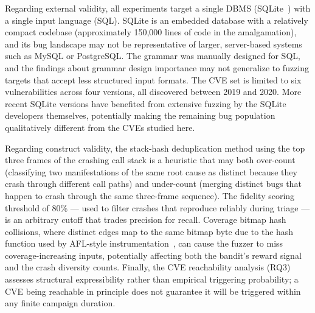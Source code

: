 Regarding external validity, all experiments target a single DBMS (SQLite~\cite{sqlite}) with a single input language (SQL). SQLite is an embedded database with a relatively compact codebase (approximately 150,000 lines of code in the amalgamation), and its bug landscape may not be representative of larger, server-based systems such as MySQL or PostgreSQL. The grammar was manually designed for SQL, and the findings about grammar design importance may not generalize to fuzzing targets that accept less structured input formats. The CVE set is limited to six vulnerabilities across four versions, all discovered between 2019 and 2020. More recent SQLite versions have benefited from extensive fuzzing by the SQLite developers themselves, potentially making the remaining bug population qualitatively different from the CVEs studied here.

Regarding construct validity, the stack-hash deduplication method using the top three frames of the crashing call stack is a heuristic that may both over-count (classifying two manifestations of the same root cause as distinct because they crash through different call paths) and under-count (merging distinct bugs that happen to crash through the same three-frame sequence). The fidelity scoring threshold of 80\% --- used to filter crashes that reproduce reliably during triage --- is an arbitrary cutoff that trades precision for recall. Coverage bitmap hash collisions, where distinct edges map to the same bitmap byte due to the hash function used by AFL-style instrumentation~\cite{afl}, can cause the fuzzer to miss coverage-increasing inputs, potentially affecting both the bandit's reward signal and the crash diversity counts. Finally, the CVE reachability analysis (RQ3) assesses structural expressibility rather than empirical triggering probability; a CVE being reachable in principle does not guarantee it will be triggered within any finite campaign duration.
